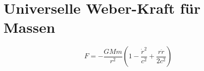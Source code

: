 \section{Universelle Weber-Kraft für Massen}
\[ F = -\frac{GMm}{r^2} \left(1 - \frac{\dot{r}^2}{c^2} + \frac{r \ddot{r}}{2c^2}\right) \]